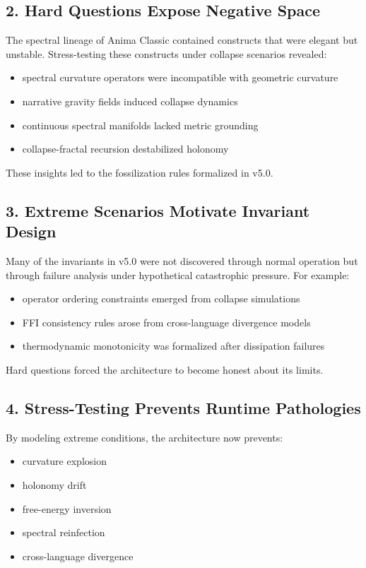 \subsection*{2. Hard Questions Expose Negative Space}

The spectral lineage of Anima Classic contained constructs that were elegant but
unstable. Stress-testing these constructs under collapse scenarios revealed:

\begin{itemize}
    \item spectral curvature operators were incompatible with geometric curvature
    \item narrative gravity fields induced collapse dynamics
    \item continuous spectral manifolds lacked metric grounding
    \item collapse-fractal recursion destabilized holonomy
\end{itemize}

These insights led to the fossilization rules formalized in v5.0.

\subsection*{3. Extreme Scenarios Motivate Invariant Design}

Many of the invariants in v5.0 were not discovered through normal operation but
through failure analysis under hypothetical catastrophic pressure. For example:

\begin{itemize}
    \item operator ordering constraints emerged from collapse simulations
    \item FFI consistency rules arose from cross-language divergence models
    \item thermodynamic monotonicity was formalized after dissipation failures
\end{itemize}

Hard questions forced the architecture to become honest about its limits.

\subsection*{4. Stress-Testing Prevents Runtime Pathologies}

By modeling extreme conditions, the architecture now prevents:

\begin{itemize}
    \item curvature explosion
    \item holonomy drift
    \item free-energy inversion
    \item spectral reinfection
    \item cross-language divergence
\end{itemize}

